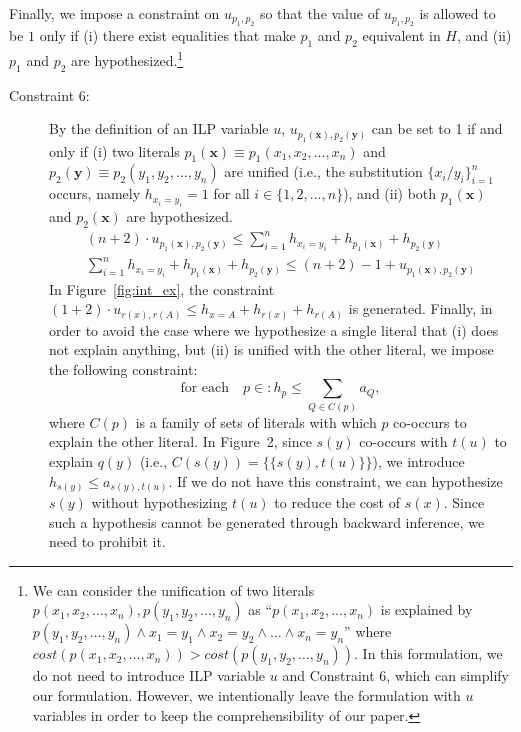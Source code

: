 \documentclass[english]{jnlp_1.4}
\def\P{}
\begin{document}
Finally, we impose a constraint on $u_{p_1,p_2}$ so that the value of
$u_{p_1,p_2}$ is allowed to be $1$ only if (i) there exist 
equalities that make $p_1$ and $p_2$ equivalent in $H$, and (ii) $p_1$
and $p_2$ are hypothesized.\footnote{We can consider the unification
  of two literals $p(x_1,x_2,\ldots,x_n),p(y_1,y_2,\ldots,y_n)$ as
  ``$p(x_1,x_2,\ldots,x_n)$ is explained by $p(y_1,y_2,\ldots,y_n)
  \land x_1=y_1 \land x_2=y_2 \land \ldots \land x_n=y_n$'' where
  $cost(p(x_1,x_2,\ldots,x_n)) > cost(p(y_1,y_2,\ldots,y_n))$. In this
  formulation, we do not need to introduce ILP variable $u$ and
  Constraint 6, which can simplify our formulation.  However, we
  intentionally leave the formulation with $u$ variables in order to
  keep the comprehensibility of our paper.  }
\begin{description}
\item[Constraint 6:] By the definition of an ILP variable $u$,
  $u_{p_1(\mathbf{x}),p_2(\mathbf{y})}$ can be set to 1 if and only if
  (i) two literals $p_1(\mathbf{x}) \equiv p_1(x_1,x_2,...,x_n)$ and
  $p_2(\mathbf{y}) \equiv p_2(y_1,y_2,...,y_n)$ are unified (i.e., the
  substitution $\{x_i/y_i\}_{i=1}^n$ occurs, namely $h_{x_i=y_i}=1$
  for all $i \in \{1,2,...,n\}$), and (ii) both $p_1(\mathbf{x})$ and
  $p_2(\mathbf{x})$ are hypothesized.
  \begin{gather}
    (n+2) \cdot u_{p_1(\mathbf{x}),p_2(\mathbf{y})} \leq \sum_{i=1}^{n}{h_{x_i=y_i}} + h_{p_1(\mathbf{x})} + h_{p_2(\mathbf{y})} \\
    \sum_{i=1}^{n}{h_{x_i=y_i}} + h_{p_1(\mathbf{x})} + h_{p_2(\mathbf{y})} \leq (n+2) - 1 + u_{p_1(\mathbf{x}),p_2(\mathbf{y})}
  \end{gather}
  In Figure~\ref{fig:int_ex}, the constraint $(1+2) \cdot u_{r(x),r(A)} \leq
  h_{x=A} + h_{r(x)} + h_{r(A)}$ is generated. 
  Finally, in order to avoid the case where we hypothesize a single
  literal that (i) does not explain anything, but (ii) is unified with
  the other literal, we impose the following constraint:
  \begin{equation}
    \text{for each}\quad p \in \P: h_{p} \le \sum_{Q \in C(p)} a_{Q},
  \end{equation}
  where $C(p)$ is a family of sets of literals with which $p$
  co-occurs to explain the other literal. In Figure~2, since $s(y)$
  co-occurs with $t(u)$ to explain $q(y)$ (i.e., $C(s(y)) = \{\{s(y),
  t(u)\}\}$), we introduce $h_{s(y)} \le a_{s(y), t(u)}$. If we do not
  have this constraint, we can hypothesize $s(y)$ without
  hypothesizing $t(u)$ to reduce the cost of $s(x)$. Since such a
  hypothesis cannot be generated through backward inference, we need
  to prohibit it.
\end{description}
\end{document}
